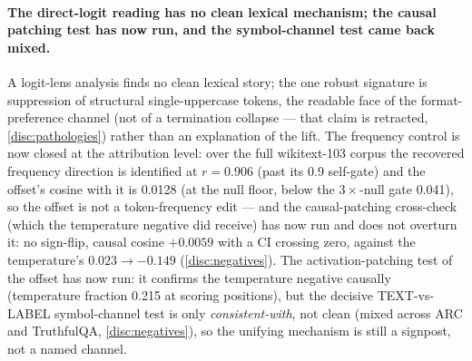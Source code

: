 \paragraph{The direct-logit reading has no clean lexical mechanism; the causal
patching test has now run, and the symbol-channel test came back mixed.}
A logit-lens analysis finds no clean lexical story; the one robust signature is
suppression of structural single-uppercase tokens, the readable face of the
format-preference channel (not of a termination collapse --- that claim is
retracted, \cref{disc:pathologies}) rather than an explanation of the lift. The
frequency control is now closed at the attribution level: over the full
wikitext-103 corpus the recovered frequency direction is identified at $r{=}0.906$
(past its 0.9 self-gate) and the offset's cosine with it is 0.0128 (at the null
floor, below the $3\times$-null gate 0.041), so the offset is not a token-frequency
edit --- and the causal-patching cross-check (which the temperature negative did
receive) has now run and does not overturn it: no sign-flip, causal cosine
$+0.0059$ with a CI crossing zero, against the temperature's
$0.023 \rightarrow -0.149$ (\cref{disc:negatives}). The activation-patching test of
the offset has now run: it confirms the temperature negative causally (temperature
fraction 0.215 at scoring positions), but the decisive TEXT-vs-LABEL symbol-channel
test is only \emph{consistent-with}, not clean (mixed across ARC and TruthfulQA,
\cref{disc:negatives}), so the unifying mechanism is still a signpost, not a named
channel.

